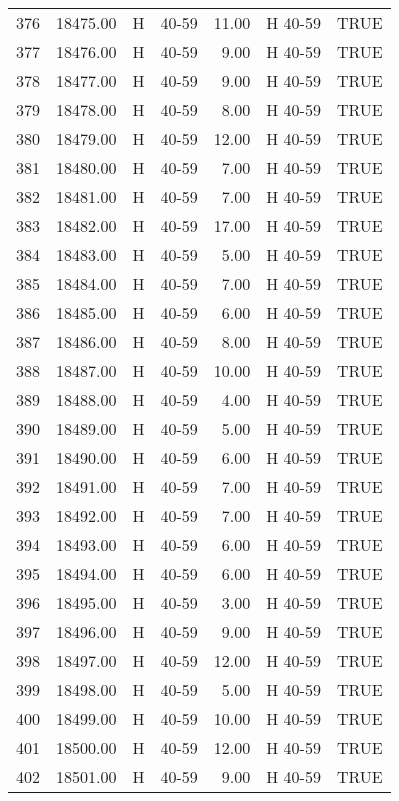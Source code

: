 \begin{table}[ht]
\begin{tabular}{rrllrll}
  376 & 18475.00 & H & 40-59 & 11.00 & H 40-59 & TRUE \\ 
  377 & 18476.00 & H & 40-59 & 9.00 & H 40-59 & TRUE \\ 
  378 & 18477.00 & H & 40-59 & 9.00 & H 40-59 & TRUE \\ 
  379 & 18478.00 & H & 40-59 & 8.00 & H 40-59 & TRUE \\ 
  380 & 18479.00 & H & 40-59 & 12.00 & H 40-59 & TRUE \\ 
  381 & 18480.00 & H & 40-59 & 7.00 & H 40-59 & TRUE \\ 
  382 & 18481.00 & H & 40-59 & 7.00 & H 40-59 & TRUE \\ 
  383 & 18482.00 & H & 40-59 & 17.00 & H 40-59 & TRUE \\ 
  384 & 18483.00 & H & 40-59 & 5.00 & H 40-59 & TRUE \\ 
  385 & 18484.00 & H & 40-59 & 7.00 & H 40-59 & TRUE \\ 
  386 & 18485.00 & H & 40-59 & 6.00 & H 40-59 & TRUE \\ 
  387 & 18486.00 & H & 40-59 & 8.00 & H 40-59 & TRUE \\ 
  388 & 18487.00 & H & 40-59 & 10.00 & H 40-59 & TRUE \\ 
  389 & 18488.00 & H & 40-59 & 4.00 & H 40-59 & TRUE \\ 
  390 & 18489.00 & H & 40-59 & 5.00 & H 40-59 & TRUE \\ 
  391 & 18490.00 & H & 40-59 & 6.00 & H 40-59 & TRUE \\ 
  392 & 18491.00 & H & 40-59 & 7.00 & H 40-59 & TRUE \\ 
  393 & 18492.00 & H & 40-59 & 7.00 & H 40-59 & TRUE \\ 
  394 & 18493.00 & H & 40-59 & 6.00 & H 40-59 & TRUE \\ 
  395 & 18494.00 & H & 40-59 & 6.00 & H 40-59 & TRUE \\ 
  396 & 18495.00 & H & 40-59 & 3.00 & H 40-59 & TRUE \\ 
  397 & 18496.00 & H & 40-59 & 9.00 & H 40-59 & TRUE \\ 
  398 & 18497.00 & H & 40-59 & 12.00 & H 40-59 & TRUE \\ 
  399 & 18498.00 & H & 40-59 & 5.00 & H 40-59 & TRUE \\ 
  400 & 18499.00 & H & 40-59 & 10.00 & H 40-59 & TRUE \\ 
  401 & 18500.00 & H & 40-59 & 12.00 & H 40-59 & TRUE \\ 
  402 & 18501.00 & H & 40-59 & 9.00 & H 40-59 & TRUE \\ 

\end{tabular}
\end{table}
